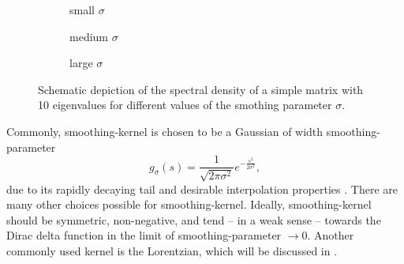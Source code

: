 \begin{figure}[ht]
    \begin{subfigure}[b]{0.32\columnwidth}
        
        \caption{small $\sigma$}
        \label{fig:1-introduction-spectral-density-example-0.01}
    \end{subfigure}
    \begin{subfigure}[b]{0.32\columnwidth}
        
        \caption{medium $\sigma$}
        \label{fig:1-introduction-spectral-density-example-0.02}
    \end{subfigure}
    \begin{subfigure}[b]{0.32\columnwidth}
        
        \caption{large $\sigma$}
        \label{fig:1-introduction-spectral-density-example-0.05}
    \end{subfigure}
    \caption{Schematic depiction of the spectral density of a simple matrix with
    10 eigenvalues for different values of the smothing parameter $\sigma$.}
    \label{fig:1-introduction-smoothened-spectral-density}
\end{figure}

Commonly, \gls{smoothing-kernel} is chosen to be a Gaussian of width \gls{smoothing-parameter}
\begin{equation}
    g_{\sigma}(s) = \frac{1}{\sqrt{2 \pi \sigma^2}} e^{-\frac{s^2}{2\sigma^2}},
    \label{equ:1-introduction-def-gaussian-kernel}
\end{equation}
due to its rapidly decaying tail and desirable interpolation properties \cite{lin2017randomized}.
There are many other choices possible for \gls{smoothing-kernel}. Ideally,
\gls{smoothing-kernel} should be symmetric, non-negative, and tend -- in a weak sense --
towards the Dirac delta function in the limit of \gls{smoothing-parameter} $\to 0$. Another
commonly used kernel is the Lorentzian, which will be discussed in .\\

